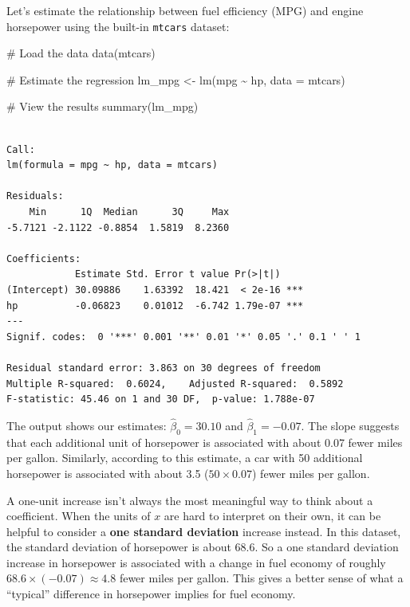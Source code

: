 \documentclass[
  letterpaper,
  DIV=11,
  numbers=noendperiod]{scrreprt}
\newenvironment{Shaded}{\begin{snugshade}}{\end{snugshade}}
\newcommand{\AttributeTok}[1]{\textcolor[rgb]{0.40,0.45,0.13}{#1}}
\newcommand{\CommentTok}[1]{\textcolor[rgb]{0.37,0.37,0.37}{#1}}
\newcommand{\FunctionTok}[1]{\textcolor[rgb]{0.28,0.35,0.67}{#1}}
\newcommand{\NormalTok}[1]{\textcolor[rgb]{0.00,0.23,0.31}{#1}}
\newcommand{\OtherTok}[1]{\textcolor[rgb]{0.00,0.23,0.31}{#1}}
\newcommand{\SpecialCharTok}[1]{\textcolor[rgb]{0.37,0.37,0.37}{#1}}
\begin{document}
Let's estimate the relationship between fuel efficiency (MPG) and engine
horsepower using the built-in \texttt{mtcars} dataset:

\begin{Shaded}
\begin{Highlighting}[]
\CommentTok{\# Load the data}
\FunctionTok{data}\NormalTok{(mtcars)}

\CommentTok{\# Estimate the regression}
\NormalTok{lm\_mpg }\OtherTok{\textless{}{-}} \FunctionTok{lm}\NormalTok{(mpg }\SpecialCharTok{\textasciitilde{}}\NormalTok{ hp, }\AttributeTok{data =}\NormalTok{ mtcars)}

\CommentTok{\# View the results}
\FunctionTok{summary}\NormalTok{(lm\_mpg)}
\end{Highlighting}
\end{Shaded}

\begin{verbatim}

Call:
lm(formula = mpg ~ hp, data = mtcars)

Residuals:
    Min      1Q  Median      3Q     Max 
-5.7121 -2.1122 -0.8854  1.5819  8.2360 

Coefficients:
            Estimate Std. Error t value Pr(>|t|)    
(Intercept) 30.09886    1.63392  18.421  < 2e-16 ***
hp          -0.06823    0.01012  -6.742 1.79e-07 ***
---
Signif. codes:  0 '***' 0.001 '**' 0.01 '*' 0.05 '.' 0.1 ' ' 1

Residual standard error: 3.863 on 30 degrees of freedom
Multiple R-squared:  0.6024,    Adjusted R-squared:  0.5892 
F-statistic: 45.46 on 1 and 30 DF,  p-value: 1.788e-07
\end{verbatim}

The output shows our estimates: \(\hat{\beta}_0 = 30.10\) and
\(\hat{\beta}_1 = -0.07\). The slope suggests that each additional unit
of horsepower is associated with about 0.07 fewer miles per gallon.
Similarly, according to this estimate, a car with 50 additional
horsepower is associated with about 3.5 (\(50 \times 0.07\)) fewer miles
per gallon.

A one-unit increase isn't always the most meaningful way to think about
a coefficient. When the units of \(x\) are hard to interpret on their
own, it can be helpful to consider a \textbf{one standard deviation}
increase instead. In this dataset, the standard deviation of horsepower
is about 68.6. So a one standard deviation increase in horsepower is
associated with a change in fuel economy of roughly
\(68.6 \times (-0.07) \approx 4.8\) fewer miles per gallon. This gives a
better sense of what a ``typical'' difference in horsepower implies for
fuel economy.
\end{document}
